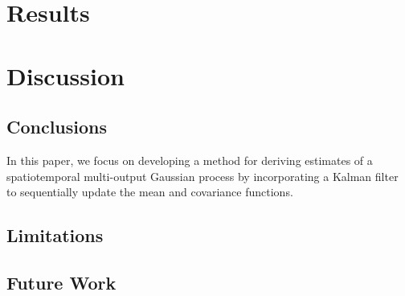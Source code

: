 \documentclass[10pt]{article}
\begin{document}



\section{Results}
\label{sec:results}

\section{Discussion}
\label{sec:discussion}

\subsection{Conclusions}

In this paper, we focus on developing a method for deriving estimates of a spatiotemporal multi-output Gaussian process by incorporating a Kalman filter to sequentially update the mean and covariance functions.


\subsection{Limitations}

\subsection{Future Work}





\newpage



\end{document}
